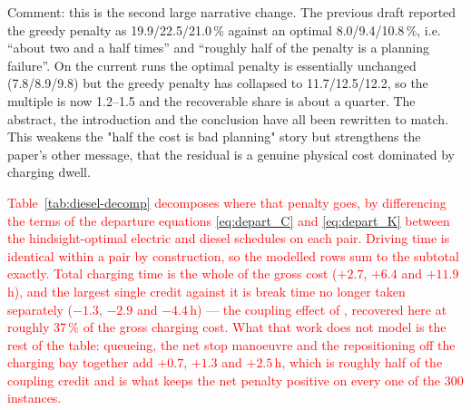 \documentclass[preprint,12pt,3p]{elsarticle}
\newcommand{\red}[1]{\textcolor{red}{#1}}
\newcommand{\green}[1]{{\color{darkgreen}#1}}
\begin{document}
\green{Comment: this is the second large narrative change. The previous draft
reported the greedy penalty as 19.9/22.5/21.0\,\% against an optimal
8.0/9.4/10.8\,\%, i.e. ``about two and a half times'' and ``roughly half of the
penalty is a planning failure''. On the current runs the optimal penalty is
essentially unchanged (7.8/8.9/9.8) but the greedy penalty has collapsed to
11.7/12.5/12.2, so the multiple is now 1.2--1.5 and the recoverable share is
about a quarter. The abstract, the introduction and the conclusion have all been
rewritten to match. This weakens the "half the cost is bad planning" story but
strengthens the paper's other message, that the residual is a genuine physical
cost dominated by charging dwell.}

\red{Table~\ref{tab:diesel-decomp} decomposes where that penalty goes, by
differencing the terms of the departure equations \eqref{eq:depart_C} and
\eqref{eq:depart_K} between the hindsight-optimal electric and diesel schedules
on each pair. Driving time is identical within a pair by construction, so the
modelled rows sum to the subtotal exactly. Total charging time is the whole of
the gross cost ($+2.7$, $+6.4$ and $+11.9$\,h), and the largest single credit
against it is break time no longer taken separately ($-1.3$, $-2.9$ and
$-4.4$\,h) --- the coupling effect of \citet{brockmann_break-and-charge_2025},
recovered here at roughly 37\,\% of the gross charging cost. What that work does
not model is the rest of the table: queueing, the net stop manoeuvre and the
repositioning off the charging bay together add $+0.7$, $+1.3$ and $+2.5$\,h,
which is roughly half of the coupling credit and is what keeps the net penalty
positive on every one of the 300 instances.}
\end{document}
